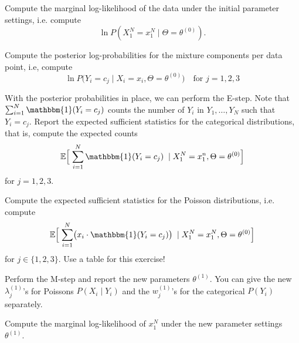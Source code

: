 \documentclass[a4paper,10pt,landscape,twocolumn]{scrartcl}
\newcommand{\Ind}[1]{\mathbbm{1}(#1)}
\begin{document}
\begin{exercise}
	
	
	\begin{subex}[1pt]
		Compute the marginal log-likelihood of the data under the initial parameter settings, i.e. compute 
		\[
		\ln P(X_1^N = x_1^N \mid \Theta = \theta^{(0)}).
		\]
	\end{subex}
	
	\begin{subex}[2pt]
		Compute the posterior log-probabilities for the mixture components per data point, i.e, compute
		\[
			\ln P\bigl(Y_i = c_j \mid X_i = x_i, \Theta = \theta^{(0)}\bigr) \quad \text{for $j=1,2,3$}
		\]
	\end{subex}
	
	\begin{subex}[2pt]
		With the posterior probabilities in place, we can perform the E-step. Note that $\sum_{i=1}^N \Ind{Y_i = c_j}$ counts the number of $Y_i$ in $Y_1, \dots, Y_N$ such that $Y_i = c_j$. Report the expected sufficient statistics for the categorical distributions, that is, compute the expected counts
		\[
			\mathbb E\Bigl[ \; \sum_{i=1}^N \Ind{Y_i = c_j} \; \mid X_1^N = x_1^n, \Theta = \theta^{(0)} \Bigr]
		\]
		for $j = 1, 2, 3$.
	\end{subex}

	\begin{subex}[2pt]
	Compute the expected sufficient statistics for the Poisson distributions, i.e. compute 
	\[
		\mathbb E\Bigl[\;\sum_{i=1}^N \bigl(x_i \cdot \Ind{Y_i = c_j}\bigr) \;\mid X_1^N = x_1^N, \Theta=\theta^{(0)}\Bigr]
	\] for  $j\in \{1, 2, 3\}$. Use a table for this exercise!
	\end{subex}
	
	\begin{subex}[2pt]
	Perform the M-step and report the new parameters $\theta^{(1)}$. You can give the new $\lambda_j^{(1)}$'s for Poissons $P(X_i \mid Y_i)$ and the $w_j^{(1)}$'s for the categorical $ P(Y_i) $ separately.
	\end{subex}
	
	\begin{subex}[1pt]
		Compute the marginal log-likelihood of $ x_1^N $ under the new parameter settings $\theta^{(1)}$. 
	\end{subex}


\end{exercise}
\end{document}
